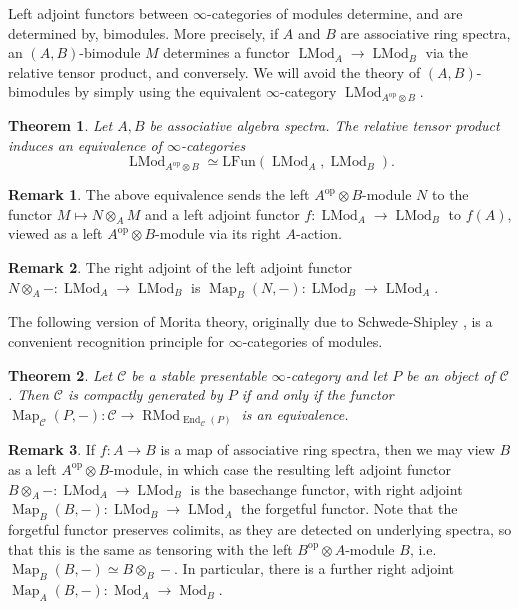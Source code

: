 \documentclass[12pt]{article}
\newtheorem{theorem}{Theorem}[subsection]
\theoremstyle{definition}
\newtheorem{remark}{Remark}[subsection]
\newcommand{\C}{\mathcal{C}}
\renewcommand{\i}{\infty}
\newcommand{\op}{\mathrm{op}}
\DeclareMathOperator{\LMod}{LMod}
\DeclareMathOperator{\RMod}{RMod}
\DeclareMathOperator{\Mod}{Mod}
\DeclareMathOperator{\End}{End}
\newcommand{\Funl}{\mathrm{LFun}}
\DeclareMathOperator{\Map}{Map}
\begin{document}
Left adjoint functors between $\i$-categories of modules determine, and are determined by, bimodules.
More precisely, if $A$ and $B$ are associative ring spectra, an $(A,B)$-bimodule $M$ determines a functor $\LMod_A\to\LMod_B$ via the relative tensor product, and conversely.
We will avoid the theory of $(A,B)$-bimodules by simply using the equivalent $\infty$-category $\LMod_{A^{\op}\otimes B}$.
\begin{theorem}{\em \cite[Theorem 7.1.2.4]{HA}}
Let $A, B$ be associative algebra spectra.
The relative tensor product induces an equivalence of $\i$-categories
\[
\LMod_{A^{\op}\otimes B}\simeq\Funl(\LMod_A,\LMod_B).
\]
\end{theorem}
\begin{remark}
The above equivalence sends the left $A^{\op}\otimes B$-module $N$ to the functor $M\mapsto N\otimes_A M$ and a left adjoint functor $f:\LMod_A\to\LMod_B$ to $f(A)$, viewed as a left $A^{\op}\otimes B$-module via its right $A$-action.
\end{remark}

\begin{remark}
The right adjoint of the left adjoint functor $N\otimes_A -:\LMod_A\to\LMod_B$ is $\Map_B(N,-):\LMod_B\to\LMod_A$.
\end{remark}

The following version of Morita theory, originally due to Schwede-Shipley \cite{SS}, is a convenient recognition principle for $\infty$-categories of modules.

\begin{theorem}{\em \cite[Theorem 7.1.2.1]{HA}}
Let $\C$ be a stable presentable $\infty$-category and let $P$ be an object of $\C$. Then $\C$ is compactly generated by $P$ if and only if the functor $\Map_{\C}(P,-)\colon  \C\to\RMod_{\End_{\C}(P)}$ is an equivalence.
\end{theorem}

\begin{remark}
If $f:A\to B$ is a map of associative ring spectra, then we may view $B$ as a left $A^{\op}\otimes B$-module, in which case the resulting left adjoint functor $B\otimes_A -:\LMod_A\to\LMod_B$ is the basechange functor, with right adjoint $\Map_B(B,-):\LMod_B\to\LMod_A$ the forgetful functor.
Note that the forgetful functor preserves colimits, as they are detected on underlying spectra, so that this is the same as tensoring with the left $B^{\op}\otimes A$-module $B$, i.e. $\Map_B(B,-)\simeq B\otimes_B -$.
In particular, there is a further right adjoint $\Map_A(B,-):\Mod_A\to\Mod_B$.
\end{remark}
\end{document}

